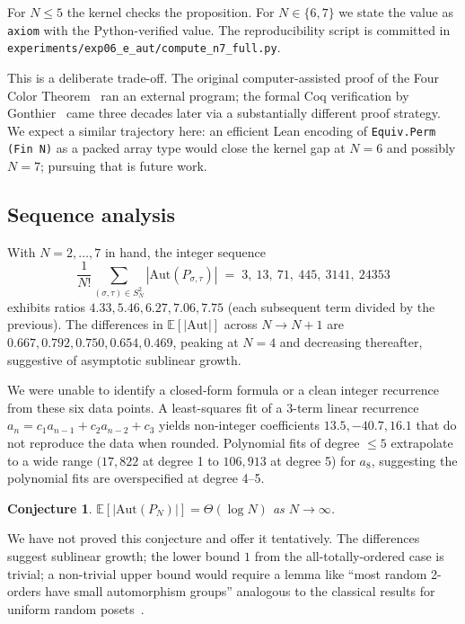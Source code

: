 \documentclass[11pt]{article}
\newtheorem{conjecture}[theorem]{Conjecture}
\theoremstyle{definition}
\begin{document}
For $N \le 5$ the kernel checks the proposition. For $N \in \{6, 7\}$ we
state the value as \texttt{axiom} with the Python-verified value. The
reproducibility script is committed in
\texttt{experiments/exp06\_e\_aut/compute\_n7\_full.py}.

This is a deliberate trade-off. The original computer-assisted proof of the
Four Color Theorem~\cite{appel_haken} ran an external program; the formal
Coq verification by Gonthier~\cite{gonthier} came three decades later via a
substantially different proof strategy. We expect a similar trajectory here:
an efficient Lean encoding of \texttt{Equiv.Perm (Fin N)} as a packed array
type would close the kernel gap at $N = 6$ and possibly $N = 7$; pursuing
that is future work.

\subsection{Sequence analysis}

With $N = 2, \ldots, 7$ in hand, the integer sequence
\[
    \frac{1}{N!} \sum_{(\sigma, \tau) \in S_N^2} |\mathrm{Aut}(P_{\sigma, \tau})|
    \;=\; 3,\ 13,\ 71,\ 445,\ 3141,\ 24353
\]
exhibits ratios $4.33, 5.46, 6.27, 7.06, 7.75$ (each subsequent term divided by
the previous). The differences in $\mathbb{E}[|\mathrm{Aut}|]$ across $N \to N+1$
are $0.667, 0.792, 0.750, 0.654, 0.469$, peaking at $N = 4$ and decreasing
thereafter, suggestive of asymptotic sublinear growth.

We were unable to identify a closed-form formula or a clean integer recurrence
from these six data points. A least-squares fit of a 3-term linear recurrence
$a_n = c_1 a_{n-1} + c_2 a_{n-2} + c_3$ yields non-integer coefficients
$13.5, -40.7, 16.1$ that do not reproduce the data when rounded. Polynomial fits
of degree $\le 5$ extrapolate to a wide range $(17{,}822$ at degree 1 to
$106{,}913$ at degree 5) for $a_8$, suggesting the polynomial fits are
overspecified at degree 4--5.

\begin{conjecture}
$\mathbb{E}[|\mathrm{Aut}(P_N)|] = \Theta(\log N)$ as $N \to \infty$.
\end{conjecture}

We have not proved this conjecture and offer it tentatively. The differences
suggest sublinear growth; the lower bound $1$ from the all-totally-ordered case
is trivial; a non-trivial upper bound would require a lemma like
``most random 2-orders have small automorphism groups'' analogous to the
classical results for uniform random posets~\cite{automorphism_conjecture}.
\end{document}
